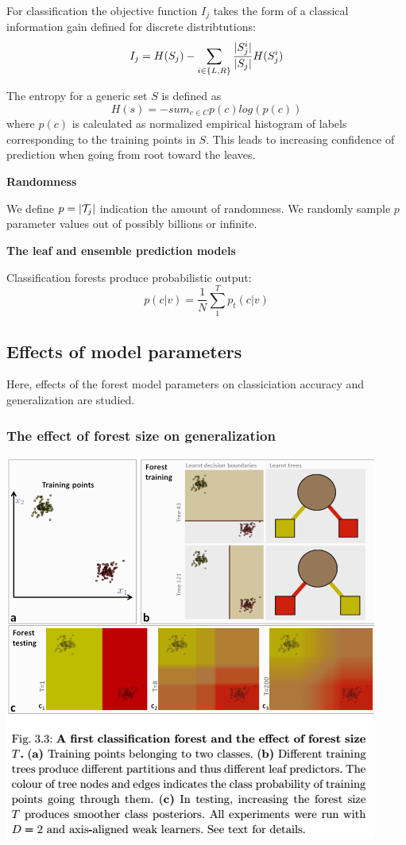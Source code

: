 \documentclass{scrartcl}
\DeclarePairedDelimiter\abs{\lvert}{\rvert}%
\begin{document}
\begin{appendices}
For classification the objective function \(I_j\) takes the form of a classical information gain defined for discrete distribtutions:
\[I_j = H(S_j) - \sum_{i \in \{L, R\}} \frac{\abs{S_j^i}}{\abs{S_j}} H(S_j^i)\]

The entropy for a generic set \(S\) is defined as
\[H(s) = -sum_{c \in C} p(c) log(p(c))\]
where \(p(c)\) is calculated as normalized empirical histogram of labels corresponding to the training points in \(S\). This leads to increasing confidence of prediction when going from root toward the leaves.

\textbf{Randomness}

We define \(p = \abs{\mathcal{T}_j}\) indication the amount of randomness. We randomly sample \(p\) parameter values out of possibly billions or infinite.

\textbf{The leaf and ensemble prediction models}

Classification forests produce probabilistic output:
\[p(c|v) = \frac{1}{N} \sum_1^T p_t(c|v)\]

\subsection{Effects of model parameters}
Here, effects of the forest model parameters on classiciation accuracy and generalization are studied.
\subsubsection{The effect of forest size on generalization}
\begin{center}
    \includegraphics[scale=1]{img/forestsize.png}
\end{center}


\end{appendices}
\end{document}
